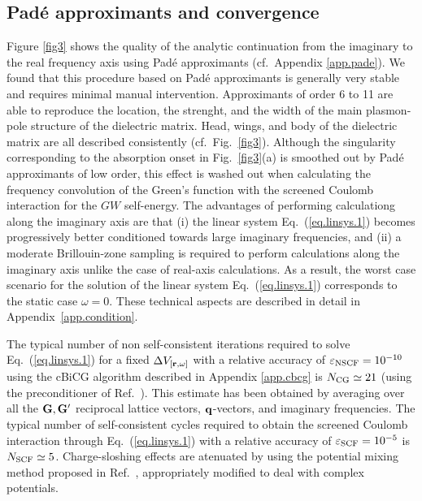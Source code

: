 \documentclass[twocolumn,prb,showpacs,superscriptaddress]{revtex4}
\def\w{\omega}
\def\q{{\bf q}}
\def\G{{\bf G}}
\def\Gp{{\bf G^\prime}}
\def\r{{\bf r}}
\begin{document}
\subsection{Pad\'e approximants and convergence}\label{sec.conv}

Figure \ref{fig3} shows the quality of the analytic continuation from the imaginary to
the real frequency axis using Pad\'e approximants (cf.\ Appendix \ref{app.pade}).\cite{pade1,pade2} We found that this procedure based on 
Pad\'e approximants is generally very stable and requires minimal manual intervention.
Approximants of order 6 to 11 are able to reproduce the location, the strenght, and the width of
the main plasmon-pole structure of the dielectric matrix. Head, wings, and body of the
dielectric matrix are all described consistently (cf.\ Fig.\ \ref{fig3}). Although the singularity
corresponding to the absorption onset in Fig.\ \ref{fig3}(a) is smoothed out by 
Pad\'e approximants of low order, this effect
is washed out when calculating the frequency convolution of the Green's function with
the screened Coulomb interaction for the $GW$ self-energy.
The advantages of performing calculationg along the imaginary axis are that (i) the 
linear system Eq.\ (\ref{eq.linsys.1}) becomes progressively better conditioned
towards large imaginary frequencies, and (ii) a moderate Brillouin-zone sampling is
required to perform calculations along the imaginary axis unlike the case of real-axis
calculations. As a result, the worst case scenario for the solution
of the linear system Eq.\ (\ref{eq.linsys.1}) corresponds to the static case $\w=0$.
These technical aspects are described in detail in Appendix~\ref{app.condition}.

The typical number of non self-consistent iterations required to solve Eq.\ (\ref{eq.linsys.1})
for a fixed $\Delta V_{[\r,\w]}$ with a relative accuracy of $\varepsilon_{\rm NSCF}=10^{-10}$
using the cBiCG algorithm described in Appendix \ref{app.cbcg} is $N_{\rm CG}\simeq 21$
(using the preconditioner of Ref.\ ). This estimate has been obtained by averaging
over all the $\G,\Gp$ reciprocal lattice vectors, $\q$-vectors, and imaginary frequencies.
The typical number of self-consistent cycles required to obtain the screened Coulomb
interaction through Eq.\ (\ref{eq.linsys.1}) with a relative accuracy of $\varepsilon_{\rm SCF}=10^{-5}$ 
is $N_{\rm SCF}\simeq 5$.
%
%
Charge-sloshing effects are atenuated by using the potential mixing method proposed in
 Ref.\ , appropriately modified to deal with complex potentials. 
\end{document}
